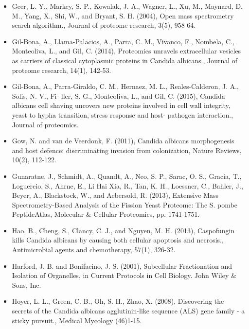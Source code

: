 \begin{itemize}
\item[]{%
Geer, L. Y., Markey, S. P., Kowalak, J. A., Wagner, L., Xu, M., Maynard, D. M., Yang, X., Shi, W.,
and Bryant, S. H. (2004), Open mass spectrometry search algorithm., Journal of proteome
research, 3(5), 958-64.
}

\item[]{%
Gil-Bona, A., Llama-Palacios, A., Parra, C. M., Vivanco, F., Nombela, C., Monteoliva, L., and
Gil, C. (2014), Proteomics unravels extracellular vesicles as carriers of classical cytoplasmic
proteins in Candida albicans., Journal of proteome research, 14(1), 142-53.
}

\item[]{%
Gil-Bona, A., Parra-Giraldo, C. M., Hernaez, M. L., Reales-Calderon, J. A., Solis, N. V., Fi-
ller, S. G., Monteoliva, L., and Gil, C. (2015), Candida albicans cell shaving uncovers new
proteins involved in cell wall integrity, yeast to hypha transition, stress response and host-
pathogen interaction., Journal of proteomics.
}


\item[]{%
Gow, N. and van de Veerdonk, F. (2011), Candida albicans morphogenesis and host defence:
discriminating invasion from colonization, Nature Reviews, 10(2), 112-122.
}

\item[]{%
Gunaratne, J., Schmidt, A., Quandt, A., Neo, S. P., Sarac, O. S., Gracia, T., Loguercio, S.,
Ahrne, E., Li Hai Xia, R., Tan, K. H., Loessner, C., Bahler, J., Beyer, A., Blackstock, W., and
Aebersold, R. (2013), Extensive Mass Spectrometry-Based Analysis of the Fission Yeast
Proteome: The S. pombe PeptideAtlas, Molecular \& Cellular Proteomics, pp. 1741-1751.
}

\item[]{%
Hao, B., Cheng, S., Clancy, C. J., and Nguyen, M. H. (2013), Caspofungin kills 
Candida albicans by causing both cellular apoptosis and necrosis.,
Antimicrobial agents and chemotherapy, 57(1), 326-32.
}

\item[]{%
Harford, J. B. and Bonifacino, J. S. (2001), 
Subcellular Fractionation and Isolation of Organelles,
in Current Protocols in Cell Biology. John Wiley \& Sons, Inc.
}

\item[]{
Hoyer, L. L., Green, C. B., Oh, S. H., Zhao, X.  (2008),
Discovering the secrets of the Candida albicans agglutinin-like sequence (ALS) gene family - a sticky pursuit., 
Medical Mycology (46)1-15.
}


\end{itemize}
